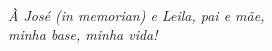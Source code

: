 


\thispagestyle{plain}

\

\vfill

\begin{flushright}
\hfill \textit{À José (in memorian) e Leila, pai e mãe, \\
minha base, minha vida! }
\end{flushright}

\vspace*{1cm}

\clearpage
